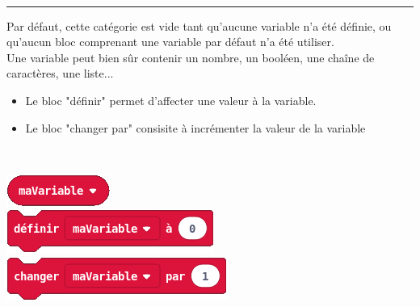 \begin{minipage}[t]{0.75\linewidth}

    \begin{blocVariable}\\
      \rule{-0.25em}{2em}
      Par défaut, cette catégorie est vide tant qu'aucune variable n'a été définie, ou qu'aucun bloc comprenant une variable par défaut n'a été utiliser.\\
      Une variable peut bien sûr contenir un nombre, un booléen, une chaîne de caractères, une liste...

      \begin{itemize}
        \item Le bloc "définir" permet d'affecter une valeur à la variable.
        \item Le bloc "changer par" consisite à incrémenter la valeur de la variable
      \end{itemize}

    \end{blocVariable}

\end{minipage}
\hfill
\begin{minipage}[t]{0.25\linewidth}~\\
  \vspace{5mm}

    \includegraphics[scale=0.4]{res/blocsMkCd/MB_makecode_variables-variable.png}\\[0.5em]
    \includegraphics[scale=0.4]{res/blocsMkCd/MB_makecode_variables-definir.png}\\[0.5em]
    \includegraphics[scale=0.4]{res/blocsMkCd/MB_makecode_variables-incrementer.png}

\end{minipage}

